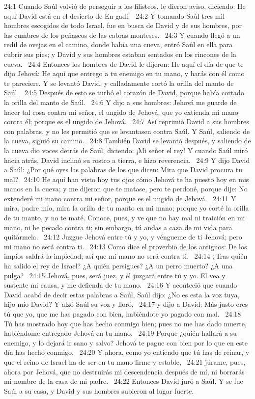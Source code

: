 24:1 Cuando Saúl volvió de perseguir a los filisteos, le dieron aviso, diciendo: He aquí David está en el desierto de En-gadi.  
24:2 Y tomando Saúl tres mil hombres escogidos de todo Israel, fue en busca de David y de sus hombres, por las cumbres de los peñascos de las cabras monteses.  
24:3 Y cuando llegó a un redil de ovejas en el camino, donde había una cueva, entró Saúl en ella para cubrir sus pies; y David y sus hombres estaban sentados en los rincones de la cueva.  
24:4 Entonces los hombres de David le dijeron: He aquí el día de que te dijo Jehová: He aquí que entrego a tu enemigo en tu mano, y harás con él como te pareciere. Y se levantó David, y calladamente cortó la orilla del manto de Saúl.  
24:5 Después de esto se turbó el corazón de David, porque había cortado la orilla del manto de Saúl.  
24:6 Y dijo a sus hombres: Jehová me guarde de hacer tal cosa contra mi señor, el ungido de Jehová, que yo extienda mi mano contra él; porque es el ungido de Jehová.  
24:7 Así reprimió David a sus hombres con palabras, y no les permitió que se levantasen contra Saúl. Y Saúl, saliendo de la cueva, siguió su camino.  
24:8 También David se levantó después, y saliendo de la cueva dio voces detrás de Saúl, diciendo: ¡Mi señor el rey! Y cuando Saúl miró hacia atrás, David inclinó su rostro a tierra, e hizo reverencia.  
24:9 Y dijo David a Saúl: ¿Por qué oyes las palabras de los que dicen: Mira que David procura tu mal?  
24:10 He aquí han visto hoy tus ojos cómo Jehová te ha puesto hoy en mis manos en la cueva; y me dijeron que te matase, pero te perdoné, porque dije: No extenderé mi mano contra mi señor, porque es el ungido de Jehová.  
24:11 Y mira, padre mío, mira la orilla de tu manto en mi mano; porque yo corté la orilla de tu manto, y no te maté. Conoce, pues, y ve que no hay mal ni traición en mi mano, ni he pecado contra ti; sin embargo, tú andas a caza de mi vida para quitármela.  
24:12 Juzgue Jehová entre tú y yo, y véngueme de ti Jehová; pero mi mano no será contra ti.  
24:13 Como dice el proverbio de los antiguos: De los impíos saldrá la impiedad; así que mi mano no será contra ti.  
24:14 ¿Tras quién ha salido el rey de Israel? ¿A quién persigues? ¿A un perro muerto? ¿A una pulga?  
24:15 Jehová, pues, será juez, y él juzgará entre tú y yo. El vea y sustente mi causa, y me defienda de tu mano.  
24:16 Y aconteció que cuando David acabó de decir estas palabras a Saúl, Saúl dijo: ¿No es esta la voz tuya, hijo mío David? Y alzó Saúl su voz y lloró,  
24:17 y dijo a David: Más justo eres tú que yo, que me has pagado con bien, habiéndote yo pagado con mal.  
24:18 Tú has mostrado hoy que has hecho conmigo bien; pues no me has dado muerte, habiéndome entregado Jehová en tu mano.  
24:19 Porque ¿quién hallará a su enemigo, y lo dejará ir sano y salvo? Jehová te pague con bien por lo que en este día has hecho conmigo.  
24:20 Y ahora, como yo entiendo que tú has de reinar, y que el reino de Israel ha de ser en tu mano firme y estable,  
24:21 júrame, pues, ahora por Jehová, que no destruirás mi descendencia después de mí, ni borrarás mi nombre de la casa de mi padre.  
24:22 Entonces David juró a Saúl. Y se fue Saúl a su casa, y David y sus hombres subieron al lugar fuerte.  
